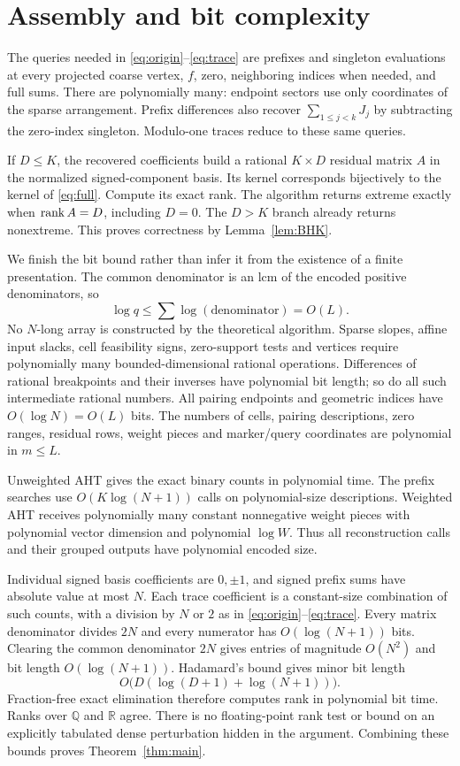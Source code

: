 \documentclass[11pt]{article}
\newcommand{\R}{\mathbb R}\newcommand{\Q}{\mathbb Q}\newcommand{\Z}{\mathbb Z}
\begin{document}
\section{Assembly and bit complexity}\label{sec:assembly}
The queries needed in \eqref{eq:origin}--\eqref{eq:trace} are prefixes and singleton evaluations at every projected coarse vertex, $f$, zero, neighboring indices when needed, and full sums. There are polynomially many: endpoint sectors use only coordinates of the sparse arrangement. Prefix differences also recover $\sum_{1\leq j<k}J_j$ by subtracting the zero-index singleton. Modulo-one traces reduce to these same queries.

If $D\leq K$, the recovered coefficients build a rational $K\times D$ residual matrix $A$ in the normalized signed-component basis. Its kernel corresponds bijectively to the kernel of \eqref{eq:full}. Compute its exact rank. The algorithm returns extreme exactly when $\operatorname{rank} A=D$, including $D=0$. The $D>K$ branch already returns nonextreme. This proves correctness by Lemma~\ref{lem:BHK}.

We finish the bit bound rather than infer it from the existence of a finite presentation. The common denominator is an lcm of the encoded positive denominators, so
\[
 \log q\leq\sum \log(\text{denominator})=O(L).
\]
No $N$-long array is constructed by the theoretical algorithm. Sparse slopes, affine input slacks, cell feasibility signs, zero-support tests and vertices require polynomially many bounded-dimensional rational operations. Differences of rational breakpoints and their inverses have polynomial bit length; so do all such intermediate rational numbers. All pairing endpoints and geometric indices have $O(\log N)=O(L)$ bits. The numbers of cells, pairing descriptions, zero ranges, residual rows, weight pieces and marker/query coordinates are polynomial in $m\leq L$.

Unweighted AHT gives the exact binary counts in polynomial time. The prefix searches use $O(K\log(N+1))$ calls on polynomial-size descriptions. Weighted AHT receives polynomially many constant nonnegative weight pieces with polynomial vector dimension and polynomial $\log W$. Thus all reconstruction calls and their grouped outputs have polynomial encoded size.

Individual signed basis coefficients are $0,\pm1$, and signed prefix sums have absolute value at most $N$. Each trace coefficient is a constant-size combination of such counts, with a division by $N$ or $2$ as in \eqref{eq:origin}--\eqref{eq:trace}. Every matrix denominator divides $2N$ and every numerator has $O(\log(N+1))$ bits. Clearing the common denominator $2N$ gives entries of magnitude $O(N^2)$ and bit length $O(\log(N+1))$. Hadamard's bound gives minor bit length
\[
 O\bigl(D(\log(D+1)+\log(N+1))\bigr).
\]
Fraction-free exact elimination therefore computes rank in polynomial bit time. Ranks over $\Q$ and $\R$ agree. There is no floating-point rank test or bound on an explicitly tabulated dense perturbation hidden in the argument. Combining these bounds proves Theorem~\ref{thm:main}.
\end{document}
